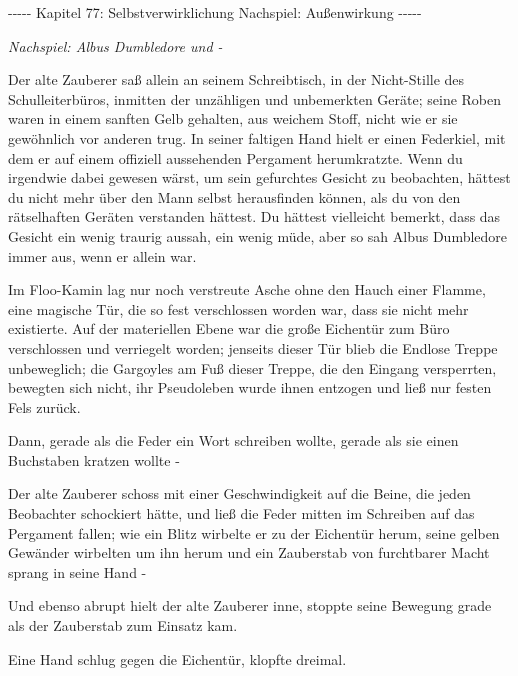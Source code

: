 

\hypertarget{selbstverwirklichung-nachspiel-auuxdfenwirkung}{%

-\/-\/-\/-\/- Kapitel 77: Selbstverwirklichung Nachspiel: Außenwirkung -\/-\/-\/-\/-

\emph{Nachspiel: Albus Dumbledore und -}

Der alte Zauberer saß allein an seinem Schreibtisch, in der Nicht-Stille des Schulleiterbüros, inmitten der unzähligen und unbemerkten Geräte; seine Roben waren in einem sanften Gelb gehalten, aus weichem Stoff, nicht wie er sie gewöhnlich vor anderen trug. In seiner faltigen Hand hielt er einen Federkiel, mit dem er auf einem offiziell aussehenden Pergament herumkratzte. Wenn du irgendwie dabei gewesen wärst, um sein gefurchtes Gesicht zu beobachten, hättest du nicht mehr über den Mann selbst herausfinden können, als du von den rätselhaften Geräten verstanden hättest. Du hättest vielleicht bemerkt, dass das Gesicht ein wenig traurig aussah, ein wenig müde, aber so sah Albus Dumbledore immer aus, wenn er allein war.

Im Floo-Kamin lag nur noch verstreute Asche ohne den Hauch einer Flamme, eine magische Tür, die so fest verschlossen worden war, dass sie nicht mehr existierte. Auf der materiellen Ebene war die große Eichentür zum Büro verschlossen und verriegelt worden; jenseits dieser Tür blieb die Endlose Treppe unbeweglich; die Gargoyles am Fuß dieser Treppe, die den Eingang versperrten, bewegten sich nicht, ihr Pseudoleben wurde ihnen entzogen und ließ nur festen Fels zurück.

Dann, gerade als die Feder ein Wort schreiben wollte, gerade als sie einen Buchstaben kratzen wollte -

Der alte Zauberer schoss mit einer Geschwindigkeit auf die Beine, die jeden Beobachter schockiert hätte, und ließ die Feder mitten im Schreiben auf das Pergament fallen; wie ein Blitz wirbelte er zu der Eichentür herum, seine gelben Gewänder wirbelten um ihn herum und ein Zauberstab von furchtbarer Macht sprang in seine Hand -

Und ebenso abrupt hielt der alte Zauberer inne, stoppte seine Bewegung grade als der Zauberstab zum Einsatz kam.

Eine Hand schlug gegen die Eichentür, klopfte dreimal.

}
